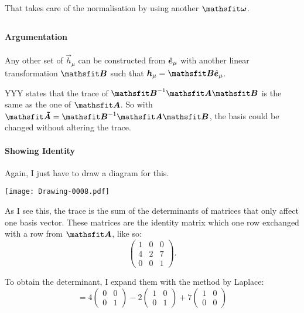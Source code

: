 That takes care of the normalisation by using another $\tens \omega$.

\subsection{}

\paragraph{Argumentation}

Any other set of $\vec h_\mu$ can be constructed from $\hat{\boldsymbol{e}}_\mu$ with another
linear transformation $\tens B$ such that $\vec h_\mu = \tens B \ev_\mu$.

YYY states that the trace of $\tens B^{-1} \tens A \tens B$ is the same as the
one of $\tens A$. So with $\tens{\tilde A} = \tens B^{-1} \tens A \tens B$, the
basis could be changed without altering the trace.

\paragraph{Showing Identity}

Again, I just have to draw a diagram for this.
\begin{center}
    \texttt{[image: Drawing-0008.pdf]}
\end{center}

As I see this, the trace is the sum of the determinants of matrices that only
affect one basis vector. These matrices are the identity matrix which one row
exchanged with a row from $\tens A$, like so:
\[
    \begin{pmatrix}
        1 & 0 & 0 \\
        4 & 2 & 7 \\
        0 & 0 & 1
    \end{pmatrix}.
\]

To obtain the determinant, I expand them with the method by Laplace:
\[
    = 4 \begin{pmatrix}
        0 & 0 \\ 0 & 1
    \end{pmatrix}
    - 2 \begin{pmatrix}
        1 & 0 \\ 0 & 1
    \end{pmatrix}
    + 7 \begin{pmatrix}
        1 & 0 \\ 0 & 0
    \end{pmatrix}
\]


